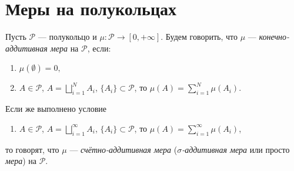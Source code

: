 \section{Меры на полукольцах}

\begin{definition}
    Пусть $\mathcal{P}$ — полукольцо и $\mu: \mathcal{P} \to [0, +\infty]$.
    Будем говорить, что $\mu$ — \textit{конечно-аддитивная мера} на $\mathcal{P}$, если:
    \begin{enumerate}
        \item $\mu(\emptyset) = 0,$
        \item $A \in \mathcal{P}$, $A = \bigsqcup\limits_{i=1}^N A_i$, $\{A_i\} \subset \mathcal{P}$, то $\mu(A) = \sum\limits_{i=1}^N \mu(A_i)$.
    \end{enumerate}
    Если же выполнено условие
    \begin{enumerate}
        \item[$2'.$] $A \in \mathcal{P}$, $A = \bigsqcup\limits_{i=1}^{\infty} A_i$, $\{A_i\} \subset \mathcal{P}$, то $\mu(A) = \sum\limits_{i=1}^{\infty} \mu(A_i)$,
    \end{enumerate}
    то говорят, что $\mu$ — \textit{счётно-аддитивная мера} (\textit{$\sigma$-аддитивная мера} или просто \textit{мера}) на $\mathcal{P}$.
\end{definition} 

